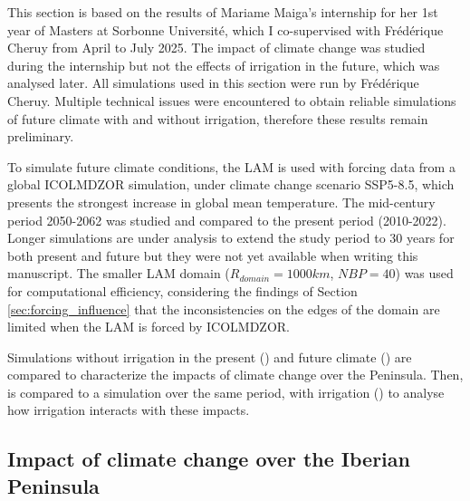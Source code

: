 This section is based on the results of Mariame Maiga's internship for her 1st year of Masters at Sorbonne Université, which I co-supervised with Frédérique Cheruy from April to July 2025. The impact of climate change was studied during the internship but not the effects of irrigation in the future, which was analysed later. All simulations used in this section were run by Frédérique Cheruy. 
Multiple technical issues were encountered to obtain reliable simulations of future climate with and without irrigation, therefore these results remain preliminary.

\hfill

To simulate future climate conditions, the LAM is used with forcing data from a global ICOLMDZOR simulation, under climate change scenario SSP5-8.5, which presents the strongest increase in global mean temperature. The mid-century period 2050-2062 was studied and compared to the present period (2010-2022). Longer simulations are under analysis to extend the study period to 30 years for both present and future but they were not yet available when writing this manuscript.
The smaller LAM domain ($R_{domain} = 1000 km$, $NBP=40$) was used for computational efficiency, considering the findings of Section \ref{sec:forcing_influence} that the inconsistencies on the edges of the domain are limited when the LAM is forced by ICOLMDZOR.

Simulations without irrigation in the present (\presnoirr) and future climate (\futnoirr) are compared to characterize the impacts of climate change over the Peninsula. Then, \futnoirr is compared to a simulation over the same period, with irrigation (\futirr) to analyse how irrigation interacts with these impacts.

\subsection{Impact of climate change over the Iberian Peninsula}


